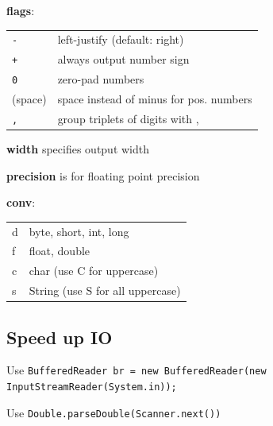 \documentclass[10pt,a4paper,ngerman,oneside,]{article}
\begin{document}
\textbf{flags}: \\ \begin{tabular}{ll}
  \texttt{-} & left-justify (default: right) \\
  \texttt{+} & always output number sign \\
  \texttt{0} & zero-pad numbers \\
  (space)    & space instead of minus for pos. numbers \\
  \texttt{,} & group triplets of digits with ,
\end{tabular}

\textbf{width} specifies output width

\textbf{precision} is for floating point precision

\textbf{conv}: \\ \begin{tabular}{ll}
  d & byte, short, int, long \\
  f & float, double \\
  c & char (use C for uppercase) \\
  s & String (use S for all uppercase)
\end{tabular}

\subsection{Speed up IO}
Use \texttt{BufferedReader br = new BufferedReader(new
InputStreamReader(System.in));}

Use \texttt{Double.parseDouble(Scanner.next())}




\end{document}
